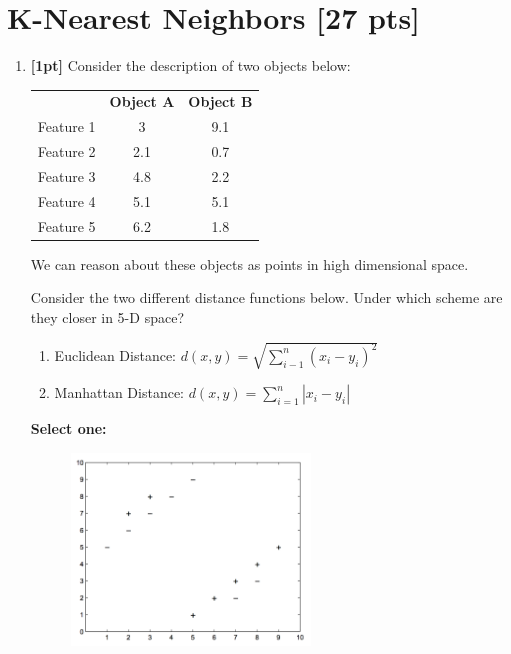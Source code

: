 \documentclass[12pt]{article}
\renewcommand{\circle}{\tikz\draw[black] (0,0) circle (1ex);}
\begin{document}
\section{K-Nearest Neighbors [27 pts]}
\begin{enumerate}
    \item \textbf{[1pt]} Consider the description of two objects below:
    
    \begin{table}[H]
        \centering
        \begin{tabular}{c c c}
             & \textbf{Object A} & \textbf{Object B} \\
            Feature 1 & 3 & 9.1 \\
            Feature 2 & 2.1 & 0.7 \\
            Feature 3 & 4.8 & 2.2 \\
            Feature 4 & 5.1 & 5.1 \\
            Feature 5 & 6.2 & 1.8 
        \end{tabular}
    \end{table}
    We can reason about these objects as points in high dimensional space.
    
    Consider the two different distance functions below. Under which scheme are they closer in 5-D space?
    \begin{enumerate}
        \item Euclidean Distance: $d(x,y) = \sqrt{\sum_{i-1}^n (x_i - y_i)^2}$
        \item Manhattan Distance: $d(x,y) = \sum_{i=1}^n |x_i - y_i|$
    \end{enumerate}
    
    \textbf{Select one:}

    
    
    \begin{figure}[H]
        \centering
        \includegraphics[width = 0.6\textwidth]{Q2_knn.png}
        \label{Q2_knn}
    \end{figure}
    

\end{enumerate}
\end{document}
